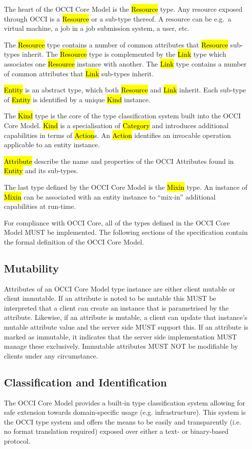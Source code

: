 \documentclass[10pt,a4paper]{article}
\begin{document}
The heart of the OCCI Core Model is the \hl{Resource} type. Any
resource exposed through OCCI is a \hl{Resource} or a sub-type
thereof.  A resource can be e.g.~a virtual machine, a job in a job
submission system, a user, etc.

The \hl{Resource} type contains a number of common attributes that
\hl{Resource} sub-types inherit. The \hl{Resource} type is
complemented by the \hl{Link} type which associates one \hl{Resource}
instance with another.
%
The \hl{Link} type contains a number of common attributes that
\hl{Link} sub-types inherit.

\hl{Entity} is an abstract type, which both \hl{Resource} and \hl{Link}
inherit.  Each sub-type of \hl{Entity} is identified by a unique
\hl{Kind} instance.

The \hl{Kind} type is the core of the type classification system built
into the OCCI Core Model. \hl{Kind} is a specialisation of
\hl{Category} and introduces additional capabilities in terms
of \hl{Action}s.  An \hl{Action} identifies an invocable operation
applicable to an entity instance.

\hl{Attribute} describe the name and properties of the OCCI Attributes found in
\hl{Entity} and its sub-types.

The last type defined by the OCCI Core Model is the \hl{Mixin}
type. An instance of \hl{Mixin} can be associated with an entity
instance to ``mix-in'' additional capabilities at run-time.

For compliance with OCCI Core, all of the types defined in the OCCI
Core Model MUST be implemented.  The following sections of the
specification contain the formal definition of the OCCI Core Model.

\subsection{Mutability}
\label{sec:mutability}
Attributes of an OCCI Core Model type instance are either client
mutable or client immutable. If an attribute is noted to be mutable
this MUST be interpreted that a client can create an instance that is
parametrised by the attribute. Likewise, if an attribute is mutable, a
client can update that instance's mutable attribute value and the
server side MUST support this. If an attribute is marked as immutable,
it indicates that the server side implementation MUST manage these
exclusively. Immutable attributes MUST NOT be modifiable by clients
under any circumstance.

\subsection{Classification and Identification}
\label{sec:classification}
The OCCI Core Model provides a built-in type classification system
allowing for safe extension towards domain-specific usage
(e.g. infrastructure). This system is the OCCI type system and offers
the means to be easily and transparently (i.e. no format translation
required) exposed over either a text- or binary-based protocol.
\end{document}
